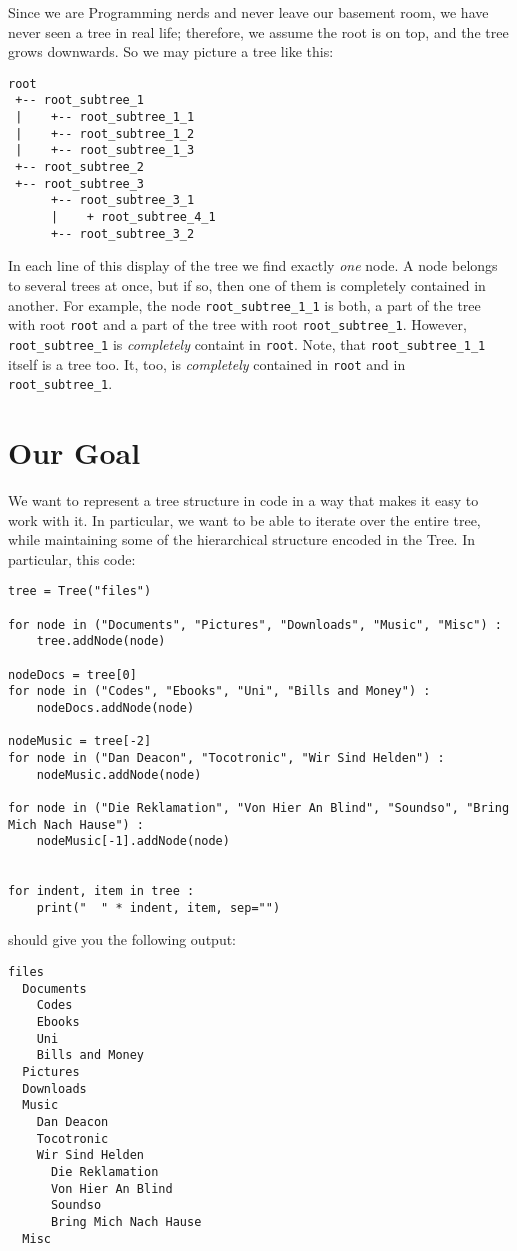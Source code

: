 \documentclass[
	english,
	fontsize=10pt,
	parskip=half,
	titlepage=true,
	DIV=12
]{scrartcl}
\begin{document}
Since we are Programming nerds and never leave our basement room, we have never seen a tree in real life; therefore, we assume the root is on top, and the tree grows downwards. So we may picture a tree like this:
\begin{verbatim}
root
 +-- root_subtree_1
 |    +-- root_subtree_1_1
 |    +-- root_subtree_1_2
 |    +-- root_subtree_1_3
 +-- root_subtree_2
 +-- root_subtree_3
      +-- root_subtree_3_1
      |    + root_subtree_4_1
      +-- root_subtree_3_2
\end{verbatim}
In each line of this display of the tree we find exactly \emph{one} node. A node belongs to several trees at once, but if so, then one of them is completely contained in another. For example, the node \texttt{root\_subtree\_1\_1} is both, a part of the tree with root \texttt{root} and a part of the tree with root \texttt{root\_subtree\_1}. However, \texttt{root\_subtree\_1} is \emph{completely} containt in \texttt{root}. Note, that \texttt{root\_subtree\_1\_1} itself is a tree too. It, too, is \emph{completely} contained in \texttt{root} and in \texttt{root\_subtree\_1}.

\section{Our Goal}
We want to represent a tree structure in code in a way that makes it easy to work with it. In particular, we want to be able to iterate over the entire tree, while maintaining some of the hierarchical structure encoded in the Tree. In particular, this code:

\begin{verbatim}
tree = Tree("files")

for node in ("Documents", "Pictures", "Downloads", "Music", "Misc") :
    tree.addNode(node)

nodeDocs = tree[0]
for node in ("Codes", "Ebooks", "Uni", "Bills and Money") :
    nodeDocs.addNode(node)

nodeMusic = tree[-2]
for node in ("Dan Deacon", "Tocotronic", "Wir Sind Helden") :
    nodeMusic.addNode(node)

for node in ("Die Reklamation", "Von Hier An Blind", "Soundso", "Bring Mich Nach Hause") :
    nodeMusic[-1].addNode(node)


for indent, item in tree :
    print("  " * indent, item, sep="")
\end{verbatim}

should give you the following output:
\begin{verbatim}
files
  Documents
    Codes
    Ebooks
    Uni
    Bills and Money
  Pictures
  Downloads
  Music
    Dan Deacon
    Tocotronic
    Wir Sind Helden
      Die Reklamation
      Von Hier An Blind
      Soundso
      Bring Mich Nach Hause
  Misc
\end{verbatim}
\end{document}
